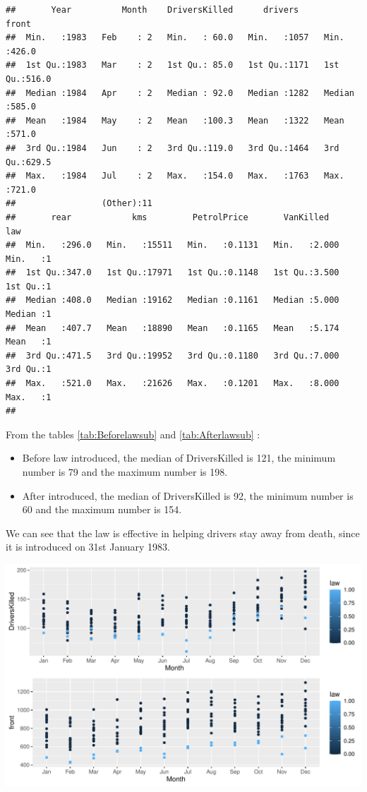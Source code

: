 \documentclass[11pt,a4paper,]{article}
\begin{document}
\begin{verbatim}
##       Year          Month    DriversKilled      drivers         front      
##  Min.   :1983   Feb    : 2   Min.   : 60.0   Min.   :1057   Min.   :426.0  
##  1st Qu.:1983   Mar    : 2   1st Qu.: 85.0   1st Qu.:1171   1st Qu.:516.0  
##  Median :1984   Apr    : 2   Median : 92.0   Median :1282   Median :585.0  
##  Mean   :1984   May    : 2   Mean   :100.3   Mean   :1322   Mean   :571.0  
##  3rd Qu.:1984   Jun    : 2   3rd Qu.:119.0   3rd Qu.:1464   3rd Qu.:629.5  
##  Max.   :1984   Jul    : 2   Max.   :154.0   Max.   :1763   Max.   :721.0  
##                 (Other):11                                                 
##       rear            kms         PetrolPrice       VanKilled          law   
##  Min.   :296.0   Min.   :15511   Min.   :0.1131   Min.   :2.000   Min.   :1  
##  1st Qu.:347.0   1st Qu.:17971   1st Qu.:0.1148   1st Qu.:3.500   1st Qu.:1  
##  Median :408.0   Median :19162   Median :0.1161   Median :5.000   Median :1  
##  Mean   :407.7   Mean   :18890   Mean   :0.1165   Mean   :5.174   Mean   :1  
##  3rd Qu.:471.5   3rd Qu.:19952   3rd Qu.:0.1180   3rd Qu.:7.000   3rd Qu.:1  
##  Max.   :521.0   Max.   :21626   Max.   :0.1201   Max.   :8.000   Max.   :1  
## 
\end{verbatim}

From the tables \ref{tab:Beforelawsub} and \ref{tab:Afterlawsub} :

\begin{itemize}
\item
  Before law introduced, the median of DriversKilled is 121, the minimum number is 79 and the maximum number is 198.
\item
  After introduced, the median of DriversKilled is 92, the minimum number is 60 and the maximum number is 154.
\end{itemize}

We can see that the law is effective in helping drivers stay away from death, since it is introduced on 31st January 1983.

\includegraphics{report_files/figure-latex/season-1.pdf}
\end{document}
